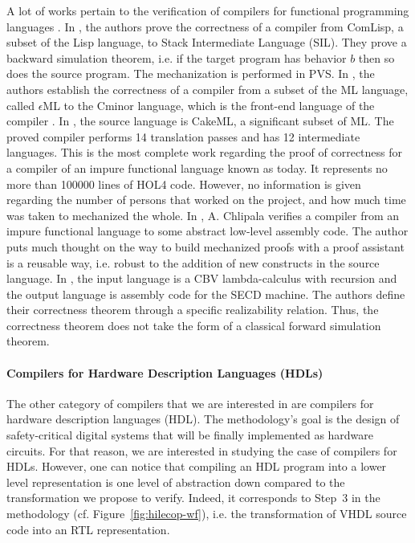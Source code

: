 \documentclass[pdflatex,sn-mathphys]{sn-jnl}%
\theoremstyle{thmstyleone}%
\theoremstyle{thmstyletwo}%
\theoremstyle{thmstylethree}%
\begin{document}
A lot of works pertain to the verification of compilers for functional
programming languages \cite{Dold2001, Dargaye2009, Benton2009,
  Chlipala2010, Tan2016}. In \cite{Dold2001}, the authors prove the
correctness of a compiler from ComLisp, a subset of the Lisp language,
to Stack Intermediate Language (SIL). They prove a backward simulation
theorem, i.e. if the target program has behavior $b$ then so does the
source program. The mechanization is performed in PVS. In
\cite{Dargaye2009, Dargaye2009Phd}, the authors establish the
correctness of a compiler from a subset of the ML language, called
$\epsilon$ML to the \textsf{Cminor} language, which is the front-end
language of the \ccert{} compiler \cite{Blazy2006}. In \cite{Tan2016},
the source language is \textsf{CakeML}, a significant subset of
ML. The proved compiler performs 14 translation passes and has 12
intermediate languages. This is the most complete work regarding the
proof of correctness for a compiler of an impure functional language
known as today. It represents no more than 100000 lines of HOL4
code. However, no information is given regarding the number of persons
that worked on the project, and how much time was taken to mechanized
the whole.  In \cite{Chlipala2010}, A. Chlipala verifies a compiler
from an impure functional language to some abstract low-level assembly
code.  The author puts much thought on the way to build mechanized
proofs with a proof assistant is a reusable way, i.e. robust to the
addition of new constructs in the source language. In
\cite{Benton2009}, the input language is a CBV lambda-calculus with
recursion and the output language is assembly code for the SECD
machine. The authors define their correctness theorem through a
specific realizability relation. Thus, the correctness theorem does
not take the form of a classical forward simulation theorem.

\paragraph{Compilers for Hardware Description Languages (HDLs)}

The other category of compilers that we are interested in are
compilers for hardware description languages (HDL). The \hilecop{}
methodology's goal is the design of safety-critical digital systems
that will be finally implemented as hardware circuits. For that
reason, we are interested in studying the case of compilers for
HDLs. However, one can notice that compiling an HDL program into a
lower level representation is one level of abstraction down compared
to the transformation we propose to verify. Indeed, it corresponds to
Step~3 in the \hilecop{} methodology
(cf. Figure~\ref{fig:hilecop-wf}), i.e. the transformation of VHDL
source code into an RTL representation.
\end{document}
